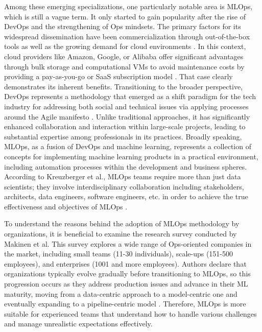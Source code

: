 Among these emerging specializations, one particularly notable area is MLOps, which is still a vague term. It only started to gain popularity after the rise of DevOps and the strengthening of Ops mindsets. The primary factors for its widespread dissemination have been commercialization through out-of-the-box tools as well as the growing demand for cloud environments \cite{kreuzberger_d_2022}. In this context, cloud providers like Amazon, Google, or Alibaba offer significant advantages through bulk storage and computational VMs to avoid maintenance costs by providing a pay-as-you-go or SaaS subscription model \cite{zhou_y_2020}. That case clearly demonstrates its inherent benefits. Transitioning to the broader perspective, DevOps represents a methodology that emerged as a shift paradigm for the tech industry for addressing both social and technical issues via applying processes around the Agile manifesto \cite{kreuzberger_d_2022}. Unlike traditional approaches, it has significantly enhanced collaboration and interaction within large-scale projects, leading to substantial expertise among professionals in its practices. Broadly speaking, MLOps, as a fusion of DevOps and machine learning, represents a collection of concepts for implementing machine learning products in a practical environment, including automation processes within the development and business spheres. According to Kreuzberger et al., MLOps teams require more than just data scientists; they involve interdisciplinary collaboration including stakeholders, architects, data engineers, software engineers, etc. in order to achieve the true effectiveness and objectives of MLOps \cite{kreuzberger_d_2022}.

To understand the reasons behind the adoption of MLOps methodology by organizations, it is beneficial to examine the research survey conducted by Makinen et al. This survey explores a wide range of Ops-oriented companies in the market, including small teams (11-30 individuals), scale-ups (151-500 employees), and enterprises (1001 and more employees). Authors declare that organizations typically evolve gradually before transitioning to MLOps, so this progression occurs as they address production issues and advance in their ML maturity, moving from a data-centric approach to a model-centric one and eventually expanding to a pipeline-centric model \cite{makinen_s_2021}. Therefore, MLOps is more suitable for experienced teams that understand how to handle various challenges and manage unrealistic expectations effectively.



